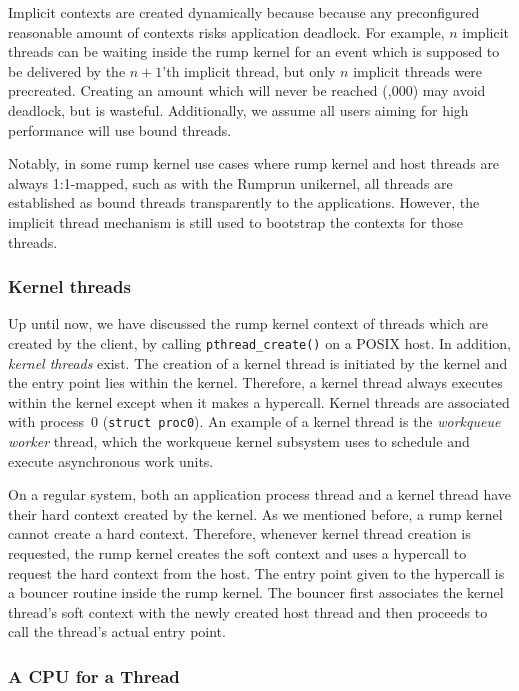 Implicit contexts are created dynamically because because any
preconfigured reasonable amount of contexts risks application deadlock.
For example, $n$ implicit threads can be waiting inside the rump kernel
for an event which is supposed to be delivered by the $n+1$'th implicit
thread, but only $n$ implicit threads were precreated.  Creating an
amount which will never be reached (,000) may avoid deadlock,
but is wasteful.  Additionally, we assume all users aiming for high
performance will use bound threads.

Notably, in some rump kernel use cases where rump kernel and host threads
are always 1:1-mapped, such as with the Rumprun unikernel, all threads
are established as bound threads transparently to the applications.  However,
the implicit thread mechanism is still used to bootstrap the contexts
for those threads.


\subsubsection{Kernel threads}

Up until now, we have discussed the rump kernel context of threads which
are created by the client, \eg by calling \verb+pthread_create()+ on a
POSIX host.
In addition, \textit{kernel threads} exist.  The creation of a kernel
thread is initiated by the kernel and the entry point lies within the
kernel.  Therefore, a kernel thread always executes within the kernel
except when it makes a hypercall.  Kernel threads are associated
with process~0 (\texttt{struct~proc0}).  An example of a kernel thread
is the \textit{workqueue worker} thread, which the workqueue kernel
subsystem uses to schedule and execute asynchronous work units.

On a regular system, both an application process thread and a kernel
thread have their hard context created by the kernel.  As we mentioned
before, a rump kernel cannot create a hard context.  Therefore, whenever
kernel thread creation is requested, the rump kernel creates the soft
context and uses a hypercall to request the hard context from the host.
The entry point given to the hypercall is a bouncer routine inside
the rump kernel.  The bouncer first associates the kernel thread's
soft context with the newly created host thread and then proceeds to
call the thread's actual entry point.

\subsubsection{A CPU for a Thread}
\label{sect:cpusched}

